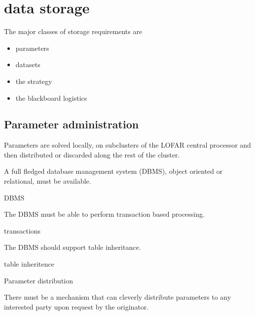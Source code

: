 \documentclass[]{lofar}
\begin{document}
  \section{data storage}
  \label{sec:data-storage}\hypertarget{sec:data-storage}{}

    The major classes of storage requirements are

    \begin{itemize}
      \item parameters
      \item datasets
      \item the strategy
      \item the blackboard logistics
    \end{itemize}

    \subsection{Parameter administration}
    \label{subsec:parameter-administration}\hypertarget{subsec:parameter-administration}{}

      Parameters are solved locally, on subclusters of the LOFAR
      central processor and then distributed or discarded along the
      rest of the cluster.

      \begin{prerequisite}
        A full fledged database management system (DBMS),
        object oriented or relational, must be available.
        \caption{DBMS\label{pre:dbms}}
      \end{prerequisite}

      \begin{prerequisite}
        The DBMS must be able to perform transaction based processing.
        \caption{transactions\label{pre:transactions}}
      \end{prerequisite}

      \begin{prerequisite}
        The DBMS should support table inheritance.
        \caption{table inheritence\label{pre:table-inheritance}}
      \end{prerequisite}

      \begin{requirement}
        \caption{Parameter distribution\label{req:parameter-distribution}}
        There must be a mechanism that can cleverly distribute
        parameters to any interested party upon request by the
        originator.
      \end{requirement}
\end{document}
